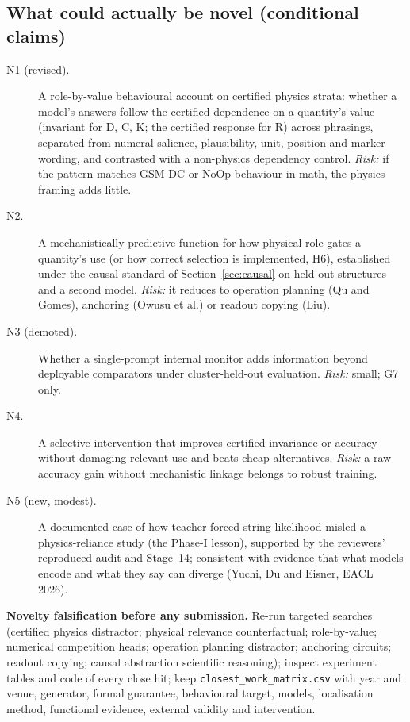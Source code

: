 \documentclass[10pt,a4paper]{article}
\begin{document}
\subsection{What could actually be novel (conditional claims)}
\begin{description}
\item[N1 (revised).] A role-by-value behavioural account on certified physics strata: whether a model's answers
follow the certified dependence on a quantity's value (invariant for D, C, K; the certified response for R) across
phrasings, separated from numeral salience, plausibility, unit, position and marker wording, and contrasted with a
non-physics dependency control. \emph{Risk:} if the pattern matches GSM-DC or NoOp behaviour in math, the physics
framing adds little.
\item[N2.] A mechanistically predictive function for how physical role gates a quantity's use (or how correct
selection is implemented, H6), established under the causal standard of Section~\ref{sec:causal} on held-out
structures and a second model. \emph{Risk:} it reduces to operation planning (Qu and Gomes), anchoring (Owusu et
al.) or readout copying (Liu).
\item[N3 (demoted).] Whether a single-prompt internal monitor adds information beyond deployable comparators under
cluster-held-out evaluation. \emph{Risk:} small; G7 only.
\item[N4.] A selective intervention that improves certified invariance or accuracy without damaging relevant use
and beats cheap alternatives. \emph{Risk:} a raw accuracy gain without mechanistic linkage belongs to robust
training.
\item[N5 (new, modest).] A documented case of how teacher-forced string likelihood misled a physics-reliance
study (the Phase-I lesson), supported by the reviewers' reproduced audit and Stage~14; consistent with evidence that
what models encode and what they say can diverge (Yuchi, Du and Eisner, EACL 2026).
\end{description}

\textbf{Novelty falsification before any submission.} Re-run targeted searches (certified physics distractor;
physical relevance counterfactual; role-by-value; numerical competition heads; operation planning distractor;
anchoring circuits; readout copying; causal abstraction scientific reasoning); inspect experiment tables and code
of every close hit; keep \texttt{closest\_work\_matrix.csv} with year and venue, generator, formal guarantee,
behavioural target, models, localisation method, functional evidence, external validity and intervention.
\end{document}
